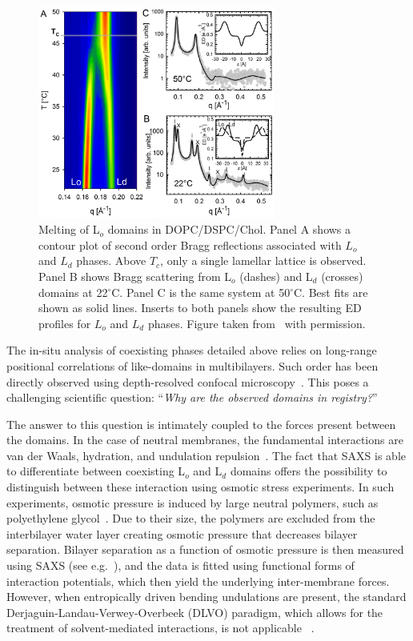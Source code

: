 \documentclass[8.5pt,twoside,twocolumn]{article}
\begin{document}
\begin{figure} [t]
	\centering
	\includegraphics[height=7cm]{figures/Lo_melting.pdf}
	\caption{Melting of L$_o$ domains in DOPC/DSPC/Chol. Panel A shows a contour plot of second order Bragg reflections associated with $L_o$ and $L_d$ phases. Above $T_c$, only a single lamellar lattice is observed. Panel B shows Bragg scattering from L$_o$ (dashes) and L$_d$ (crosses) domains at 22$^\circ$C. Panel C is the same system at 50$^\circ$C. Best fits are shown as solid lines. Inserts to both panels show the resulting ED profiles for $L_o$ and $L_d$ phases. Figure taken from~\cite{Heftberger.2015} with permission.}
	\label{fig:Lo_melting}
\end{figure}

The in-situ analysis of coexisting phases detailed above relies on long-range positional correlations of like-domains in multibilayers. Such order has been directly observed using depth-resolved confocal microscopy~\cite{Tayebi.2012}. This poses a challenging scientific question: ``\textit{Why are the observed domains in registry?}''

The answer to this question is intimately coupled to the forces present between the domains. In the case of neutral membranes, the fundamental interactions are van der Waals, hydration, and undulation repulsion~\cite{Israelachvili.2011}. The fact that SAXS is able to differentiate between coexisting L$_o$ and L$_d$ domains offers the possibility to distinguish between these interaction using osmotic stress experiments. In such experiments, osmotic pressure is induced by large neutral polymers, such as polyethylene glycol~\cite{Parsegian.1986}. Due to their size, the polymers are excluded from the interbilayer water layer creating osmotic pressure that decreases bilayer separation. Bilayer separation as a function of osmotic pressure is then measured using SAXS (see e.g.~\cite{McIntosh.1993,Parsegian.1995}), and the data is fitted using functional forms of interaction potentials, which then yield the underlying inter-membrane forces. However, when entropically driven bending undulations are present, the standard Derjaguin-Landau-Verwey-Overbeek (DLVO) paradigm, which allows for the treatment of solvent-mediated interactions, is not applicable ~\cite{Israelachvili.2011}.
\end{document}
